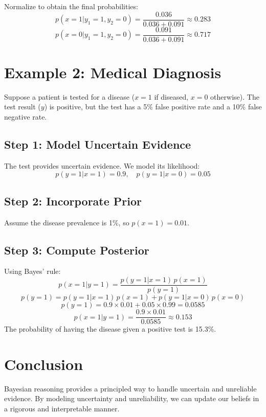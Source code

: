 \begin{notechapter}
Normalize to obtain the final probabilities:
\[
p(x = 1 | y_1 = 1, y_2 = 0) = \frac{0.036}{0.036 + 0.091} \approx 0.283
\]
\[
p(x = 0 | y_1 = 1, y_2 = 0) = \frac{0.091}{0.036 + 0.091} \approx 0.717
\]

\section{Example 2: Medical Diagnosis}
Suppose a patient is tested for a disease (\( x = 1 \) if diseased,
\( x = 0 \) otherwise). The test result (\( y \)) is positive, but
the test has a 5\% false positive rate and a 10\% false negative rate.

\subsection{Step 1: Model Uncertain Evidence}
The test provides uncertain evidence. We model its likelihood:
\[
p(y = 1 | x = 1) = 0.9, \quad p(y = 1 | x = 0) = 0.05
\]

\subsection{Step 2: Incorporate Prior}
Assume the disease prevalence is 1\%, so \( p(x = 1) = 0.01 \).

\subsection{Step 3: Compute Posterior}
Using Bayes' rule:
\[
p(x = 1 | y = 1) = \frac{p(y = 1 | x = 1) \, p(x = 1)}{p(y = 1)}
\]
\[
p(y = 1) = p(y = 1 | x = 1) \, p(x = 1) + p(y = 1 | x = 0) \, p(x = 0)
\]
\[
p(y = 1) = 0.9 \times 0.01 + 0.05 \times 0.99 = 0.0585
\]
\[
p(x = 1 | y = 1) = \frac{0.9 \times 0.01}{0.0585} \approx 0.153
\]
The probability of having the disease given a positive test is 15.3\%.

\section{Conclusion}
Bayesian reasoning provides a principled way to handle uncertain
and unreliable evidence. By modeling uncertainty and unreliability,
we can update our beliefs in a rigorous and interpretable manner.
\end{notechapter}
